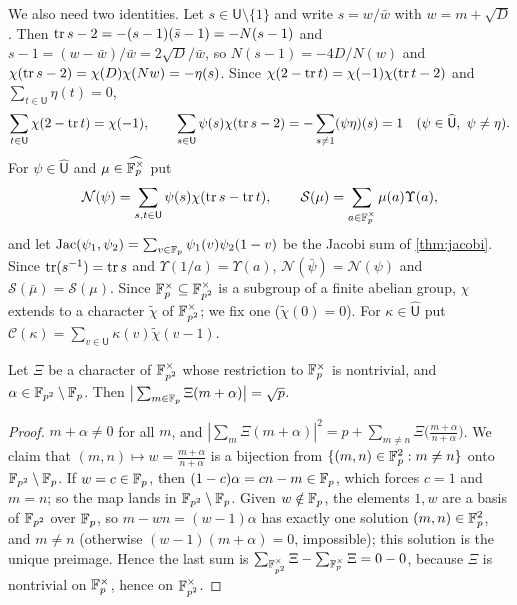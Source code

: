We also need two identities. Let $s\in\mathsf U\setminus\{1\}$ and write
$s=w/\bar w$ with $w=m+\sqrt D$. Then $\operatorname{tr} s-2=-(s-1)(\bar s-1)=-N(s-1)$ and
$s-1=(w-\bar w)/\bar w=2\sqrt D/\bar w$, so $N(s-1)=-4D/N(w)$ and
$\chi(\operatorname{tr} s-2)=\chi(D)\chi(Nw)=-\eta(s)$. Since $\chi(2-\operatorname{tr} t)=\chi(-1)\chi(\operatorname{tr} t-2)$ and $\sum_{t\in\mathsf U}\eta(t)=0$,
\begin{equation}\label{eq:dl:trace2}
  \sum_{t\in\mathsf U}\chi(2-\operatorname{tr} t)=\chi(-1),\qquad
  \sum_{s\in\mathsf U}\psi(s)\chi(\operatorname{tr} s-2)=-\sum_{s\ne1}(\psi\eta)(s)=1
  \quad(\psi\in\widehat{\mathsf U},\ \psi\ne\eta).
\end{equation}
For $\psi\in\widehat{\mathsf U}$ and $\mu\in\widehat{\mathbb F_p^\times}$ put
\[
  \mathcal N(\psi)=\sum_{s,t\in\mathsf U}\psi(s)\chi(\operatorname{tr} s-\operatorname{tr} t),\qquad
  \mathcal S(\mu)=\sum_{a\in\mathbb F_p^\times}\mu(a)\Upsilon(a),
\]
and let $\operatorname{Jac}(\psi_1,\psi_2)=\sum_{v\in\mathbb F_p}\psi_1(v)\psi_2(1-v)$ be the Jacobi
sum of \cref{thm:jacobi}. Since $\operatorname{tr}(s^{-1})=\operatorname{tr} s$ and
$\Upsilon(1/a)=\Upsilon(a)$, $\mathcal N(\bar\psi)=\mathcal N(\psi)$ and
$\mathcal S(\bar\mu)=\mathcal S(\mu)$. Since $\mathbb F_p^\times\subseteq\mathbb F_{p^2}^\times$
is a subgroup of a finite abelian group, $\chi$ extends to a character
$\tilde\chi$ of $\mathbb F_{p^2}^\times$; we fix one ($\tilde\chi(0)=0$). For
$\kappa\in\widehat{\mathsf U}$ put
$\mathcal C(\kappa)=\sum_{v\in\mathsf U}\kappa(v)\tilde\chi(v-1)$.

\begin{lemma}\label{lem:dl:line}
Let $\Xi$ be a character of $\mathbb F_{p^2}^\times$ whose restriction to
$\mathbb F_p^\times$ is nontrivial, and $\alpha\in\mathbb F_{p^2}\setminus\mathbb F_p$. Then
$\big|\sum_{m\in\mathbb F_p}\Xi(m+\alpha)\big|=\sqrt p$.
\end{lemma}

\begin{proof}
$m+\alpha\ne0$ for all $m$, and
$|\sum_m\Xi(m+\alpha)|^2=p+\sum_{m\ne n}\Xi\big(\frac{m+\alpha}{n+\alpha}\big)$.
We claim that $(m,n)\mapsto w=\frac{m+\alpha}{n+\alpha}$ is a bijection from
$\{(m,n)\in\mathbb F_p^2:m\ne n\}$ onto $\mathbb F_{p^2}\setminus\mathbb F_p$. If $w=c\in\mathbb F_p$, then
$(1-c)\alpha=cn-m\in\mathbb F_p$, which forces $c=1$ and $m=n$; so the map lands in
$\mathbb F_{p^2}\setminus\mathbb F_p$. Given $w\notin\mathbb F_p$, the elements $1,w$ are a basis of
$\mathbb F_{p^2}$ over $\mathbb F_p$, so $m-wn=(w-1)\alpha$ has exactly one solution
$(m,n)\in\mathbb F_p^2$, and $m\ne n$ (otherwise $(w-1)(m+\alpha)=0$, impossible); this
solution is the unique preimage. Hence the last sum is
$\sum_{\mathbb F_{p^2}^\times}\Xi-\sum_{\mathbb F_p^\times}\Xi=0-0$, because $\Xi$ is
nontrivial on $\mathbb F_p^\times$, hence on $\mathbb F_{p^2}^\times$.
\end{proof}

